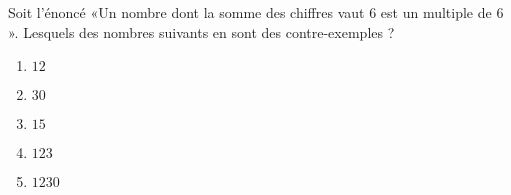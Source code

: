 
\begin{exercice}\label{exosmath-0854}

    Soit l'énoncé «Un nombre dont la somme des chiffres vaut \( 6\) est un multiple de \( 6\)». Lesquels des nombres suivants en sont des contre-exemples ?
    \begin{multicols}{2}
        \begin{enumerate}
            \item
                \( 12\)
            \item
                \( 30\)
            \item
                \( 15\)
            \item
                \( 123\)
            \item
                \( 1230\)
        \end{enumerate}
    \end{multicols}

\end{exercice}
